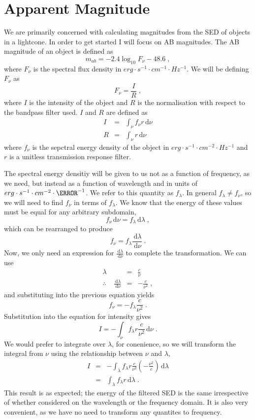 \documentclass[12pt]{scrartcl}
\newcommand{\dx}[1]{\ensuremath{\,\mathrm{d}#1}}
\begin{document}
\maketitle

\section{Apparent Magnitude}

We are primarily concerned with calculating magnitudes from the
SED of objects in a lightcone. In order to get started I will
focus on AB magnitudes. The AB magnitude of an object is defined
as
\[ m_{ab} = -2.4\log_{10}F_{\nu} - 48.6 \; , \]
where $F_\nu$ is the spectral flux density in $erg\cdot s^{-1}\cdot cm^{-1} \cdot Hz^{-1}$.
We will be defining $F_\nu$ as
\[ F_\nu = \frac{I}{R} \; , \]
where $I$ is the intensity of the object and $R$ is the normalisation
with respect to the bandpass filter used. $I$ and $R$ are defined
as
\begin{eqnarray*}
I & = & \int_\nu f_\nu r \dx{\nu} \\
R & = & \int_\nu r \dx{\nu}
\end{eqnarray*}
where $f_\nu$ is the sepctral energy density of the object in
$erg\cdot s^{-1}\cdot cm^{-2}\cdot Hz^{-1}$ and $r$ is a unitless transmission
response filter.

The spectral energy densitiy will be given
to us not as a function of frequency, as we need, but instead as
a function of wavelength and in units of
$erg\cdot s^{-1}\cdot cm^{-2}\cdot \angstrom^{-1}$. We refer to this quantity as
$f_\lambda$. In general $f_\lambda \ne f_\nu$, so we
will need to find $f_\nu$ in terms of $f_\lambda$.
We know that the energy of these values
must be equal for any arbitrary subdomain,
\[ f_\nu \dx{\nu} = f_\lambda \dx{\lambda} \; , \]
which can be rearranged to produce
\[ f_\nu = f_\lambda \frac{\dx{\lambda}}{\dx{\nu}} \; . \]
Now, we only need an expression for $\frac{\dx{\lambda}}{\dx{\nu}}$
to complete the transformation. We can use
\begin{eqnarray*}
\lambda & = & \frac{c}{\nu} \\
\therefore \;\;\;\; \frac{\dx{\lambda}}{\dx{\nu}} & = & -\frac{c}{\nu^2} \; ,
\end{eqnarray*}
and substituting into the previous equation yields
\[ f_\nu = -f_\lambda \frac{c}{\nu^2} \; . \]
Substitution into the equation for intensity gives
\[ I = -\int_\nu f_\lambda r \frac{c}{\nu^2} \dx{\nu} \; . \]
We would prefer to integrate over $\lambda$, for conenience, so
we will transform the integral from $\nu$ using the relationship
between $\nu$ and $\lambda$,
\begin{eqnarray*}
I & = & -\int_\lambda f_\lambda r \frac{c}{\nu^2} \left(-\frac{\nu^2}{c}\right) \dx{\lambda} \\
& = & \int_\lambda f_\lambda r \dx{\lambda} \; .
\end{eqnarray*}
This result is as expected; the energy of the filtered SED is the same
irrespective of whether considered on the wavelength or the
frequency domain. It is also very convenient, as we have no need
to transform any quantites to frequency.
\end{document}
